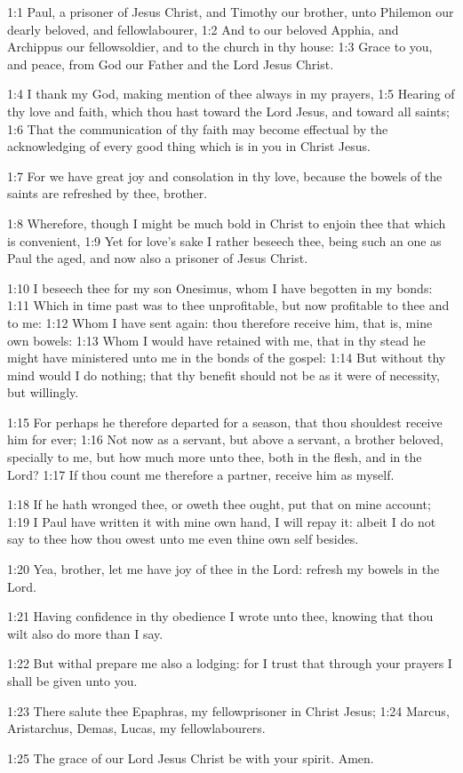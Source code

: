 

1:1 Paul, a prisoner of Jesus Christ, and Timothy our brother, unto Philemon our dearly beloved, and fellowlabourer, 1:2 And to our beloved Apphia, and Archippus our fellowsoldier, and to the church in thy house: 1:3 Grace to you, and peace, from God our Father and the Lord Jesus Christ.

1:4 I thank my God, making mention of thee always in my prayers, 1:5 Hearing of thy love and faith, which thou hast toward the Lord Jesus, and toward all saints; 1:6 That the communication of thy faith may become effectual by the acknowledging of every good thing which is in you in Christ Jesus.

1:7 For we have great joy and consolation in thy love, because the bowels of the saints are refreshed by thee, brother.

1:8 Wherefore, though I might be much bold in Christ to enjoin thee that which is convenient, 1:9 Yet for love's sake I rather beseech thee, being such an one as Paul the aged, and now also a prisoner of Jesus Christ.

1:10 I beseech thee for my son Onesimus, whom I have begotten in my bonds: 1:11 Which in time past was to thee unprofitable, but now profitable to thee and to me: 1:12 Whom I have sent again: thou therefore receive him, that is, mine own bowels: 1:13 Whom I would have retained with me, that in thy stead he might have ministered unto me in the bonds of the gospel: 1:14 But without thy mind would I do nothing; that thy benefit should not be as it were of necessity, but willingly.

1:15 For perhaps he therefore departed for a season, that thou shouldest receive him for ever; 1:16 Not now as a servant, but above a servant, a brother beloved, specially to me, but how much more unto thee, both in the flesh, and in the Lord?  1:17 If thou count me therefore a partner, receive him as myself.

1:18 If he hath wronged thee, or oweth thee ought, put that on mine account; 1:19 I Paul have written it with mine own hand, I will repay it: albeit I do not say to thee how thou owest unto me even thine own self besides.

1:20 Yea, brother, let me have joy of thee in the Lord: refresh my bowels in the Lord.

1:21 Having confidence in thy obedience I wrote unto thee, knowing that thou wilt also do more than I say.

1:22 But withal prepare me also a lodging: for I trust that through your prayers I shall be given unto you.

1:23 There salute thee Epaphras, my fellowprisoner in Christ Jesus; 1:24 Marcus, Aristarchus, Demas, Lucas, my fellowlabourers.

1:25 The grace of our Lord Jesus Christ be with your spirit. Amen.

